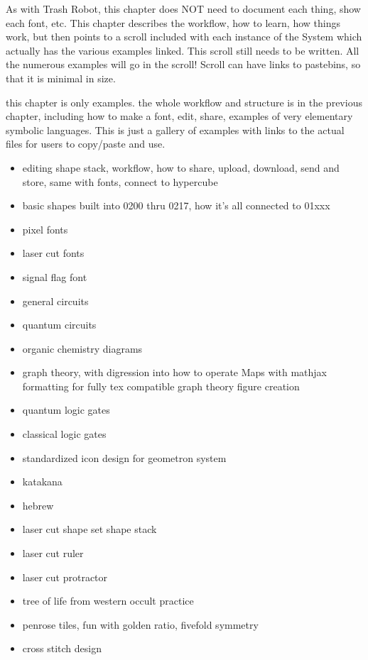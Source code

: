 As with Trash Robot, this chapter does NOT need to document each thing, show each font, etc.  This chapter describes the workflow, how to learn, how things work, but then points to a scroll included with each instance of the System which actually has the various examples linked.  This scroll still needs to be written.  All the numerous examples will go in the scroll!  Scroll can have links to pastebins, so that it is minimal in size.



this chapter is only examples. the whole workflow and structure is in the previous chapter, including how to make a font, edit, share, examples of very elementary symbolic languages.  This is just a gallery of examples with links to the actual files for users to copy/paste and use.

\begin{itemize}
\tightlist
\item
editing shape stack, workflow, how to share, upload, download, send and store, same with fonts, connect to hypercube
\item
basic shapes built into 0200 thru 0217, how it's all connected to 01xxx
\item
pixel fonts
\item
laser cut fonts
\item
signal flag font
\item
general circuits
\item
quantum circuits
\item
organic chemistry diagrams
\item
graph theory, with digression into how to operate Maps with mathjax formatting for fully tex compatible graph theory figure creation
\item
quantum logic gates
\item 
classical logic gates
\item
standardized icon design for geometron system
\item
katakana
\item
hebrew
\item
laser cut shape set shape stack
\item
laser cut ruler
\item
laser cut protractor
\item
tree of life from western occult practice
\item
penrose tiles, fun with golden ratio, fivefold symmetry
\item
cross stitch design
\end{itemize}
